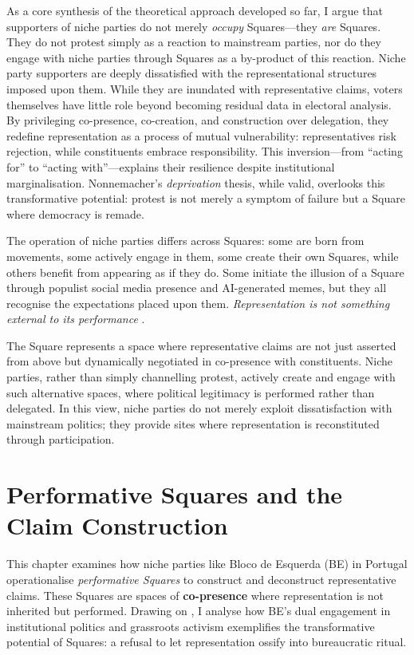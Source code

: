 As a core synthesis of the theoretical approach developed so far, I argue that supporters of niche parties do not merely \textit{occupy} Squares—they \textit{are} Squares. They do not protest simply as a reaction to mainstream parties, nor do they engage with niche parties through Squares as a by-product of this reaction. Niche party supporters are deeply dissatisfied with the representational structures imposed upon them. While they are inundated with representative claims, voters themselves have little role beyond becoming residual data in electoral analysis. By privileging co-presence, co-creation, and construction over delegation, they redefine representation as a process of mutual vulnerability: representatives risk rejection, while constituents embrace responsibility. This inversion—from \enquote{acting for} to \enquote{acting with}—explains their resilience despite institutional marginalisation. Nonnemacher’s \textit{deprivation} thesis, while valid, overlooks this transformative potential: protest is not merely a symptom of failure but a Square where democracy is remade.

The operation of niche parties differs across Squares: some are born from movements, some actively engage in them, some create their own Squares, while others benefit from appearing as if they do. Some initiate the illusion of a Square through populist social media presence and AI-generated memes, but they all recognise the expectations placed upon them. \textit{Representation is not something external to its performance} \parencite[302]{saward2010}.

The Square represents a space where representative claims are not just asserted from above but dynamically negotiated in co-presence with constituents. Niche parties, rather than simply channelling protest, actively create and engage with such alternative spaces, where political legitimacy is performed rather than delegated. In this view, niche parties do not merely exploit dissatisfaction with mainstream politics; they provide sites where representation is reconstituted through participation.
%
%
%
\chapter{Performative Squares and the Claim Construction}\label{chap:Performative Squares and the Claim Construction} %
This chapter examines how niche parties like Bloco de Esquerda (BE) in Portugal operationalise \textit{performative Squares} to construct and deconstruct representative claims. These Squares  are spaces of \textbf{co-presence} where representation is not inherited but performed. Drawing on \cite{kim2024}, I analyse how BE’s dual engagement in institutional politics and grassroots activism exemplifies the transformative potential of Squares: a refusal to let representation ossify into bureaucratic ritual.

